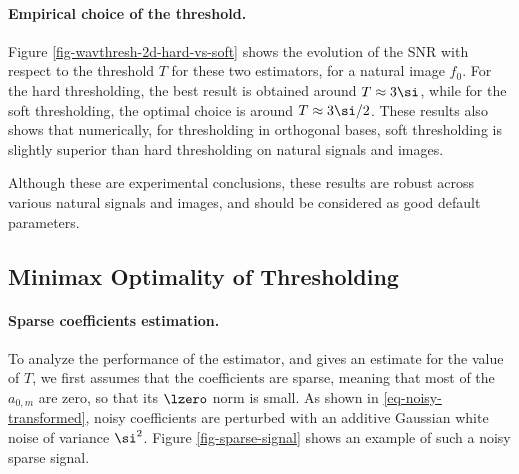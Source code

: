 

\paragraph{Empirical choice of the threshold.}

Figure \ref{fig-wavthresh-2d-hard-vs-soft} shows the evolution of the SNR with respect to the threshold $T$ for these two estimators, for a natural image $f_0$. For the hard thresholding, the best result is obtained around $T \approx 3\si$, while for the soft thresholding, the optimal choice is around $T\approx 3\si/2$. These results also shows that numerically, for thresholding in orthogonal bases, soft thresholding is slightly superior than hard thresholding on natural signals and images. 


Although these are experimental conclusions, these results are robust across various natural signals and images, and should be considered as good default parameters. 


\subsection{Minimax Optimality of Thresholding}
\label{subsec-minimax-denoise}

\paragraph{Sparse coefficients estimation.}

To analyze the performance of the estimator, and gives an estimate for the value of $T$, we first assumes that the coefficients
are sparse, meaning that most of the $a_{0,m}$ are zero, so that its $\lzero$ norm
is small. 
As shown in \eqref{eq-noisy-transformed}, noisy coefficients 
are perturbed with an additive Gaussian white noise of variance $\si^2$. Figure \ref{fig-sparse-signal} shows an example of such a noisy sparse signal. 


